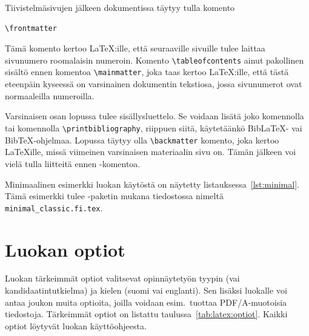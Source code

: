 Tiivistelmäsivujen jälkeen dokumentissa täytyy tulla komento
\begin{verbatim}
\frontmatter
\end{verbatim}
Tämä komento kertoo \LaTeX:ille, että seuraaville sivuille tulee laittaa sivunumero roomalaisin numeroin. Komento \verb|\tableofcontents| ainut pakollinen sisältö ennen komentoa \verb|\mainmatter|, joka taas kertoo \LaTeX:ille, että tästä eteenpäin kyseessä on varsinainen dokumentin tekstiosa, jossa sivunumerot ovat normaaleilla numeroilla.

Varsinaisen osan lopussa tulee sisällysluettelo. Se voidaan lisätä joko komennolla \verb|| tai komennolla \verb|\printbibliography|, riippuen siitä, käytetäänkö Bib\LaTeX- vai Bib\TeX-ohjelmaa. Lopussa täytyy olla \verb|\backmatter| komento, joka kertoo \LaTeX{ille}, missä viimeinen varsinaisen materiaalin sivu on. Tämän jälkeen voi vielä tulla liitteitä ennen \verb||-komentoa.

Minimaalinen esimerkki luokan käytöstä on näytetty listauksessa~\ref{lst:minimal}. Tämä esimerkki tulee \uefcsthesis-paketin mukana tiedostossa nimeltä \texttt{minimal\_classic.fi.tex}.






\section{Luokan optiot}
\label{sec:latex:optiot}

Luokan \uefcsthesis tärkeimmät optiot valitsevat opinnäytetyön tyypin (\progradututkielma vai kandidaatintutkielma) ja kielen (suomi vai englanti). Sen lisäksi luokalle voi antaa joukon muita optioita, joilla voidaan esim.\ tuottaa PDF/A-muotoisia tiedostoja. Tärkeimmät optiot on listattu taulussa~\ref{tab:latex:optiot}. Kaikki optiot löytyvät luokan käyttöohjeesta.

